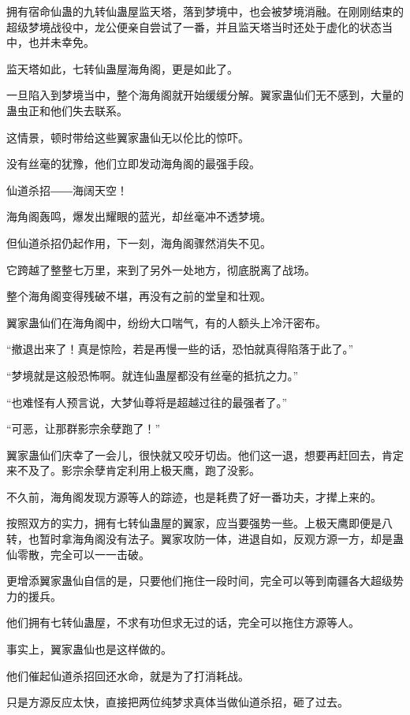 
\begin{this_body}

拥有宿命仙蛊的九转仙蛊屋监天塔，落到梦境中，也会被梦境消融。在刚刚结束的超级梦境战役中，龙公便亲自尝试了一番，并且监天塔当时还处于虚化的状态当中，也并未幸免。

监天塔如此，七转仙蛊屋海角阁，更是如此了。

一旦陷入到梦境当中，整个海角阁就开始缓缓分解。翼家蛊仙们无不感到，大量的蛊虫正和他们失去联系。

这情景，顿时带给这些翼家蛊仙无以伦比的惊吓。

没有丝毫的犹豫，他们立即发动海角阁的最强手段。

仙道杀招――海阔天空！

海角阁轰鸣，爆发出耀眼的蓝光，却丝毫冲不透梦境。

但仙道杀招仍起作用，下一刻，海角阁骤然消失不见。

它跨越了整整七万里，来到了另外一处地方，彻底脱离了战场。

整个海角阁变得残破不堪，再没有之前的堂皇和壮观。

翼家蛊仙们在海角阁中，纷纷大口喘气，有的人额头上冷汗密布。

“撤退出来了！真是惊险，若是再慢一些的话，恐怕就真得陷落于此了。”

“梦境就是这般恐怖啊。就连仙蛊屋都没有丝毫的抵抗之力。”

“也难怪有人预言说，大梦仙尊将是超越过往的最强者了。”

“可恶，让那群影宗余孽跑了！”

翼家蛊仙们庆幸了一会儿，很快就又咬牙切齿。他们这一退，想要再赶回去，肯定来不及了。影宗余孽肯定利用上极天鹰，跑了没影。

不久前，海角阁发现方源等人的踪迹，也是耗费了好一番功夫，才撵上来的。

按照双方的实力，拥有七转仙蛊屋的翼家，应当要强势一些。上极天鹰即便是八转，也暂时拿海角阁没有法子。翼家攻防一体，进退自如，反观方源一方，却是蛊仙零散，完全可以一一击破。

更增添翼家蛊仙自信的是，只要他们拖住一段时间，完全可以等到南疆各大超级势力的援兵。

他们拥有七转仙蛊屋，不求有功但求无过的话，完全可以拖住方源等人。

事实上，翼家蛊仙也是这样做的。

他们催起仙道杀招回还水命，就是为了打消耗战。

只是方源反应太快，直接把两位纯梦求真体当做仙道杀招，砸了过去。


\end{this_body}

